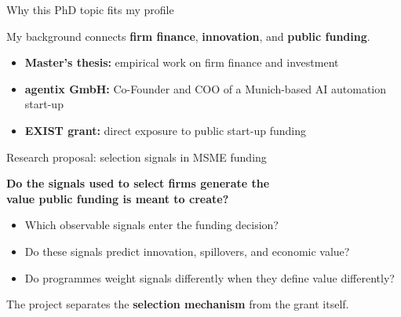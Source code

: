\documentclass[aspectratio=169]{beamer}
\newcommand{\highlight}[1]{\textcolor{VeronaBlue}{\textbf{#1}}}
\begin{document}
\begin{frame}{Why this PhD topic fits my profile}

\large
My background connects \highlight{firm finance}, \highlight{innovation}, and \highlight{public funding}.
\vspace{0.35cm}
\normalsize
\begin{itemize}
  \item \highlight{Master’s thesis:} empirical work on firm finance and investment
  \item \highlight{agentix GmbH:} Co-Founder and COO of a Munich-based AI automation start-up
  \item \highlight{EXIST grant:} direct exposure to public start-up funding
\end{itemize}

\end{frame}

\begin{frame}{Research proposal: selection signals in MSME funding}
  \begin{center}
  \Large
  \highlight{Do the signals used to select firms generate the\\ value public funding is meant to create?}
  \end{center}
  \vspace{0.35cm}
  \normalsize
  \begin{itemize}
    \item Which observable signals enter the funding decision?
    \item Do these signals predict innovation, spillovers, and economic value?
    \item Do programmes weight signals differently when they define value differently?
  \end{itemize}
  \vspace{0.3cm}
  \small
  The project separates the \highlight{selection mechanism} from the grant itself.
\end{frame}
\end{document}
